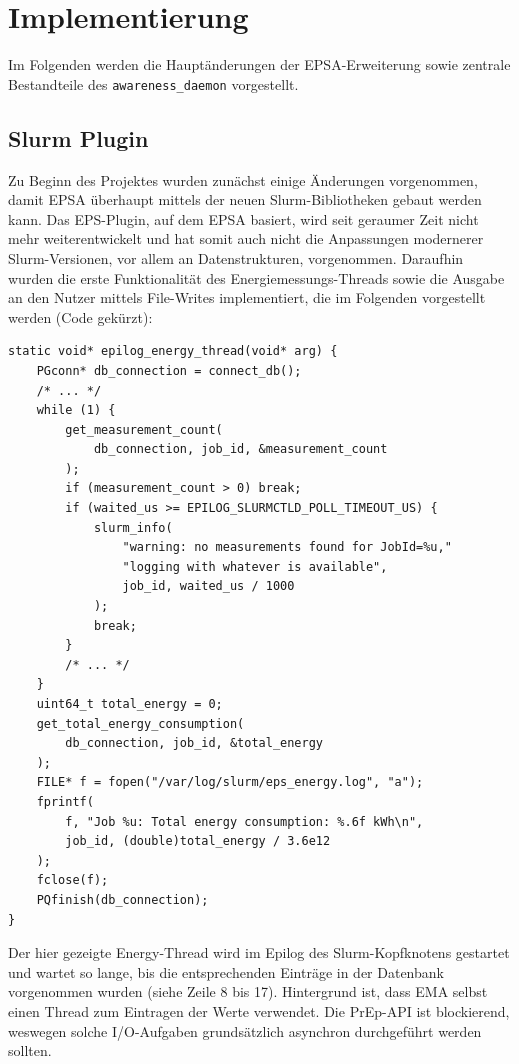\documentclass[paper=a4, fontsize=11pt]{scrartcl} %
\numberwithin{equation}{section} %
\numberwithin{figure}{section} %
\numberwithin{table}{section} %
\begin{document}
\section{Implementierung}
Im Folgenden werden die Hauptänderungen der EPSA-Erweiterung sowie zentrale Bestandteile des \texttt{awareness\_daemon} vorgestellt.
\subsection{Slurm Plugin}
Zu Beginn des Projektes wurden zunächst einige Änderungen vorgenommen, damit EPSA überhaupt mittels der neuen Slurm-Bibliotheken gebaut werden kann. Das EPS-Plugin, auf dem EPSA basiert, wird seit geraumer Zeit nicht mehr weiterentwickelt und hat somit auch nicht die Anpassungen modernerer Slurm-Versionen, vor allem an Datenstrukturen, vorgenommen. Daraufhin wurden die erste Funktionalität des Energiemessungs-Threads sowie die Ausgabe an den Nutzer mittels File-Writes implementiert, die im Folgenden vorgestellt werden (Code gekürzt):
\begin{verbatim}
static void* epilog_energy_thread(void* arg) {
    PGconn* db_connection = connect_db();
    /* ... */
    while (1) {
        get_measurement_count(
            db_connection, job_id, &measurement_count
        );
        if (measurement_count > 0) break;
        if (waited_us >= EPILOG_SLURMCTLD_POLL_TIMEOUT_US) {
            slurm_info(
                "warning: no measurements found for JobId=%u,"
                "logging with whatever is available",
                job_id, waited_us / 1000
            );
            break;
        }
        /* ... */
    }
    uint64_t total_energy = 0;
    get_total_energy_consumption(
        db_connection, job_id, &total_energy
    );
    FILE* f = fopen("/var/log/slurm/eps_energy.log", "a");
    fprintf(
        f, "Job %u: Total energy consumption: %.6f kWh\n",
        job_id, (double)total_energy / 3.6e12
    );
    fclose(f);
    PQfinish(db_connection);
}
\end{verbatim}
Der hier gezeigte Energy-Thread wird im Epilog des Slurm-Kopfknotens gestartet und wartet so lange, bis die entsprechenden Einträge in der Datenbank vorgenommen wurden (siehe Zeile 8 bis 17). Hintergrund ist, dass EMA selbst einen Thread zum Eintragen der Werte verwendet. Die PrEp-API ist blockierend, weswegen solche I/O-Aufgaben grundsätzlich asynchron durchgeführt werden sollten.
\end{document}
